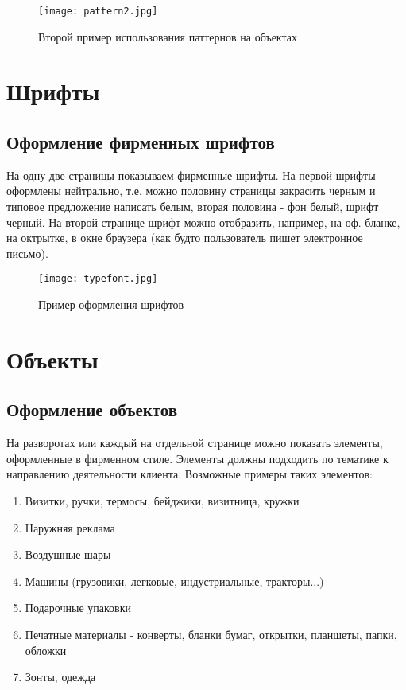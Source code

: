 \documentclass[DIV=calc, paper=a4, fontsize=11pt]{scrartcl} %
\begin{document}
\begin{figure}[H]
            \centering
            \texttt{[image: pattern2.jpg]}
            \caption{Второй пример использования паттернов на объектах \label{fig:pattern2.jpg}}
            \end{figure}
            
\section{Шрифты}

\subsection{Оформление фирменных шрифтов}
На одну-две страницы показываем фирменные шрифты. На первой шрифты оформлены нейтрально, т.е. можно половину страницы закрасить черным и типовое предложение написать белым, вторая половина - фон белый, шрифт черный. На второй странице шрифт можно отобразить, например, на оф. бланке, на октрытке, в окне браузера (как будто пользователь пишет электронное письмо).

            \begin{figure}[H]
            \centering
            \texttt{[image: typefont.jpg]}
            \caption{Пример оформления шрифтов \label{fig:typefont.jpg}}
            \end{figure}


\section{Объекты}

\subsection{Оформление объектов}
На разворотах или каждый на отдельной странице можно показать элементы, оформленные в фирменном стиле. Элементы должны подходить по тематике к направлению деятельности клиента. Возможные примеры таких элементов:
    \begin{enumerate}
        \item Визитки, ручки, термосы, бейджики, визитница, кружки
        \item Наружняя реклама
        \item Воздушные шары
        \item Машины (грузовики, легковые, индустриальные, тракторы...)
        \item Подарочные упаковки
        \item Печатные материалы - конверты, бланки бумаг, открытки, планшеты, папки, обложки
        \item Зонты, одежда
    \end{enumerate}
    
\end{document}
